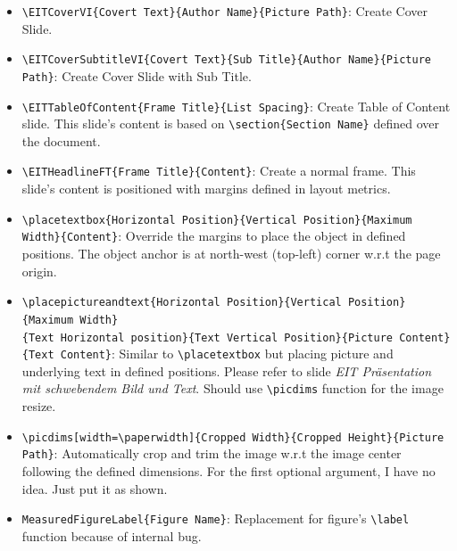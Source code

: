 \documentclass[10pt,landscape]{article}
\makeatletter
\renewcommand{\section}{\@startsection{section}{1}{0mm}%
                                {-1ex plus -.5ex minus -.2ex}%
                                {0.5ex plus .2ex}%
                                {\normalfont\large\bfseries}}
\makeatother
\begin{document}
\begin{multicols}{2}
\begin{itemize}
  \item \verb!\EITCoverVI{Covert Text}{Author Name}{Picture Path}!: Create Cover Slide.
  \item \verb!\EITCoverSubtitleVI{Covert Text}{Sub Title}{Author Name}{Picture Path}!: Create Cover Slide with Sub Title.
  \item \verb!\EITTableOfContent{Frame Title}{List Spacing}!: Create Table of Content slide. This slide's content is based on \verb!\section{Section Name}! defined over the document.
  \item \verb!\EITHeadlineFT{Frame Title}{Content}!: Create a normal frame. This slide's content is positioned with margins defined in layout metrics.
  \item \verb!\placetextbox{Horizontal Position}{Vertical Position}{Maximum Width}{Content}!: Override the margins to place the object in defined positions. The object anchor is at north-west (top-left) corner w.r.t the page origin.
  \item \verb!\placepictureandtext{Horizontal Position}{Vertical Position}{Maximum Width}!\\\verb!{Text Horizontal position}{Text Vertical Position}{Picture Content}{Text Content}!: Similar to \verb!\placetextbox! but
  placing picture and underlying text in defined positions. Please refer to slide \emph{EIT Präsentation mit schwebendem Bild und Text}. Should use \verb!\picdims! function for the image resize.
  \item \verb!\picdims[width=\paperwidth]{Cropped Width}{Cropped Height}{Picture Path}!: Automatically crop and trim the image w.r.t the image center following the defined dimensions. For the first optional argument, I have no idea. Just put it as shown.
  \item \verb!MeasuredFigureLabel{Figure Name}!: Replacement for figure's \verb!\label! function because of internal bug.
\end{itemize}


\end{multicols}
\end{document}
